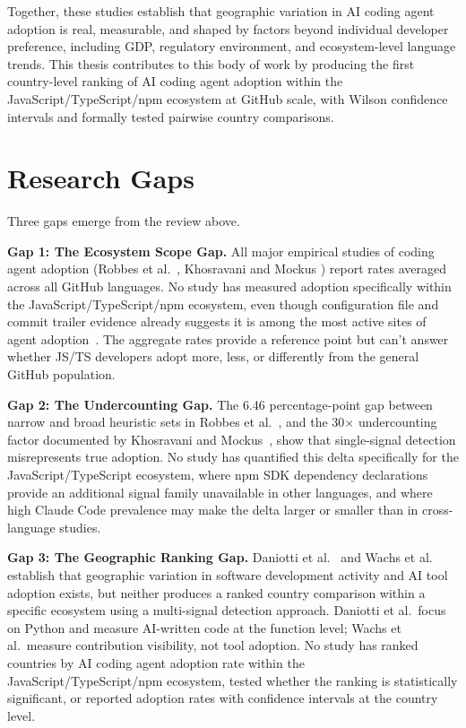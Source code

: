 Together, these studies establish that geographic variation in AI coding agent adoption is real, measurable, and shaped by factors beyond individual developer preference, including GDP, regulatory environment, and ecosystem-level language trends. This thesis contributes to this body of work by producing the first country-level ranking of AI coding agent adoption within the JavaScript/TypeScript/npm ecosystem at GitHub scale, with Wilson confidence intervals and formally tested pairwise country comparisons.

\section{Research Gaps}
\label{sec:lr:gaps}

Three gaps emerge from the review above.

\textbf{Gap 1: The Ecosystem Scope Gap.}
All major empirical studies of coding agent adoption (Robbes et al.\
\cite{robbesAgenticMuch2026,robbesAgenticVery2026}, Khosravani and Mockus
\cite{khosravani2026}) report rates averaged across all GitHub languages. No study has measured adoption specifically within the JavaScript/TypeScript/npm ecosystem, even though configuration file and commit trailer evidence already suggests it is among the most active sites of agent adoption~\cite{galsterConfig2026, octoverse2025}. The aggregate rates provide a reference point but can't answer whether JS/TS developers adopt more, less, or differently from the general GitHub population.

\textbf{Gap 2: The Undercounting Gap.}
The 6.46 percentage-point gap between narrow and broad heuristic sets in Robbes et al.~\cite{robbesAgenticMuch2026}, and the 30$\times$ undercounting factor documented by Khosravani and Mockus~\cite{khosravani2026}, show that single-signal detection misrepresents true adoption. No study has quantified this delta specifically for the JavaScript/TypeScript ecosystem, where npm SDK dependency declarations provide an additional signal family unavailable in other languages, and where high Claude Code prevalence may make the delta larger or smaller than in cross-language studies.

\textbf{Gap 3: The Geographic Ranking Gap.}
Daniotti et al.~\cite{daniotti2025} and Wachs et al.~\cite{wachs2022} establish that geographic variation in software development activity and AI tool adoption exists, but neither produces a ranked country comparison within a specific ecosystem using a multi-signal detection approach. Daniotti et al.\ focus on Python and measure AI-written code at the function level; Wachs et al.\ measure contribution visibility, not tool adoption. No study has ranked countries by AI coding agent adoption rate within the JavaScript/TypeScript/npm ecosystem, tested whether the ranking is statistically significant, or reported adoption rates with confidence intervals at the country level.

